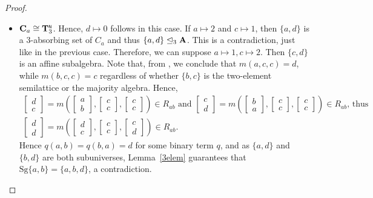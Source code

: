 \documentclass[11pt]{amsart}
\newcommand{\m}[1]{\mathbf{\uppercase{#1}}}
\newcommand{\n}{\scriptscriptstyle{\mathsf{N}}}
\theoremstyle{definition}
\theoremstyle{remark}
\theoremstyle{plain}
\begin{document}
\begin{proof}
\begin{enumerate}[wide, labelwidth=!,itemindent=!,labelindent=0pt]
\begin{enumerate}[wide, labelwidth=!,labelindent=0pt,itemindent=!]
\begin{enumerate}[wide, labelwidth=!,labelindent=0pt,itemindent=!]
\begin{itemize}[leftmargin=*]
\item $\m C_a\cong {\m T}_3^{\n}$. Hence, $d\mapsto 0$ follows in this case. If $a\mapsto 2$ and $c\mapsto 1$, then $\{a,d\}$ is a $3$-absorbing set of $C_a$ and thus $\{a,d\}\trianglelefteq_3{\m A}$. This is a contradiction, just like in the previous case.
 Therefore, we can suppose $a\mapsto 1, c\mapsto 2$. Then $\{c,d\}$ is an affine subalgebra. Note that, from , we conclude that $m(a,c,c)=d$, while $m(b,c,c)=c$ regardless of whether $\{b,c\}$ is the two-element semilattice or the majority algebra. Hence,
$$
\begin{gathered}
\begin{bmatrix}
d \\
c
\end{bmatrix}=
m\left(
\begin{bmatrix}
a \\
b
\end{bmatrix}, 
\begin{bmatrix}
c \\
c
\end{bmatrix},
\begin{bmatrix}
c \\
c
\end{bmatrix}
\right)\in R_{ab}\text{ and }
\begin{bmatrix}
c \\
d
\end{bmatrix}=
m\left(
\begin{bmatrix}
b \\
a
\end{bmatrix}, 
\begin{bmatrix}
c \\
c
\end{bmatrix},
\begin{bmatrix}
c \\
c
\end{bmatrix}
\right)\in R_{ab}\text{, thus }\\
\begin{bmatrix}
d \\
d
\end{bmatrix}=
m\left(
\begin{bmatrix}
d \\
c
\end{bmatrix}, 
\begin{bmatrix}
c \\
c
\end{bmatrix},
\begin{bmatrix}
c \\
d
\end{bmatrix}
\right)\in R_{ab}.
\end{gathered}
$$
Hence $q(a,b)=q(b,a)=d$ for some binary term $q$, and as $\{a,d\}$ and $\{b,d\}$ are both subuniverses, Lemma~\ref{3elem} guarantees that $\mathrm{Sg}\{a,b\}=\{a,b,d\}$, a contradiction.



\end{itemize}
\end{enumerate}
\end{enumerate}
\end{enumerate}
\end{proof}
\end{document}
